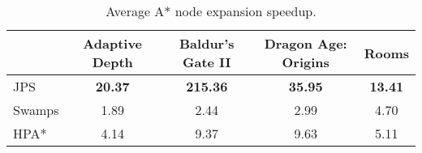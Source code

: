 \begin{table}[tb]
\begin{center}
\begin{tabular}{lcccc}
  \hline
 & Adaptive Depth & Baldur's Gate II & Dragon Age: Origins & Rooms \\ 
  \hline
JPS & \textbf{20.37} & \textbf{215.36} & \textbf{35.95} & \textbf{13.41} \\ 
  Swamps & 1.89 & 2.44 & 2.99 & 4.70 \\ 
  HPA* & 4.14 & 9.37 & 9.63 & 5.11 \\ 
   \hline
\end{tabular}
\end{center}
\caption[Node expansion speedup: JPS vs. Swamps vs. HPA{*}]
{
\small
Average A{*} node expansion speedup.
}
\label{table::jps::nodes}
\end{table}

